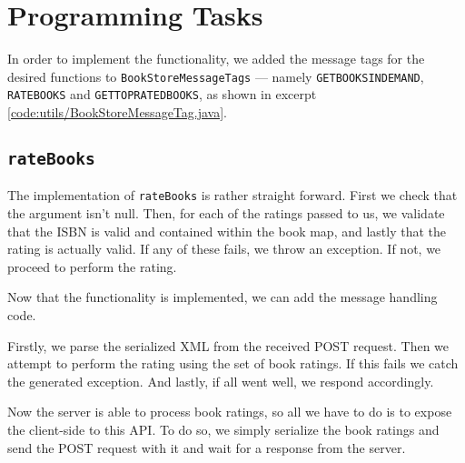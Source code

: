 
\newpage
\section{Programming Tasks}

\setlength\columnsep{30pt}
\begin{multicols}{2}
    In order to implement the functionality, we added the message tags for the
    desired functions to {\tt BookStoreMessageTags} --- namely
    {\tt GETBOOKSINDEMAND}, {\tt RATEBOOKS} and {\tt GETTOPRATEDBOOKS}, as
    shown in excerpt \ref{code:utils/BookStoreMessageTag.java}.
    
    \colbreak
    
\end{multicols}
\setlength\columnsep{10pt}

\subsection{\tt rateBooks}
The implementation of {\tt rateBooks} is rather straight forward. First we check
that the argument isn't null. Then, for each of the ratings passed to us, we
validate that the ISBN is valid and contained within the book map, and lastly
that the rating is actually valid. If any of these fails, we throw an exception.
If not, we proceed to perform the rating.

Now that the functionality is implemented, we can add the message handling code.

Firstly, we parse the serialized XML from the received POST request. Then we
attempt to perform the rating using the set of book ratings. If this fails we
catch the generated exception. And lastly, if all went well, we respond
accordingly.

Now the server is able to process book ratings, so all we have to do is to
expose the client-side to this API. To do so, we simply serialize the book
ratings and send the POST request with it and wait for a response from the
server.

